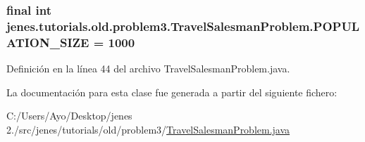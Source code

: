 \hypertarget{classjenes_1_1tutorials_1_1old_1_1problem3_1_1_travel_salesman_problem_a388d4fcbb82c911c4646c5de782f4d59}{
\subsubsection[{P\-O\-P\-U\-L\-A\-T\-I\-O\-N\-\_\-\-S\-I\-Z\-E}]{\setlength{\rightskip}{0pt plus 5cm}final int jenes.\-tutorials.\-old.\-problem3.\-Travel\-Salesman\-Problem.\-P\-O\-P\-U\-L\-A\-T\-I\-O\-N\-\_\-\-S\-I\-Z\-E = 1000\hspace{0.3cm}{\ttfamily [static]}}}\label{classjenes_1_1tutorials_1_1old_1_1problem3_1_1_travel_salesman_problem_a388d4fcbb82c911c4646c5de782f4d59}


Definición en la línea 44 del archivo Travel\-Salesman\-Problem.\-java.



La documentación para esta clase fue generada a partir del siguiente fichero\-:\begin{DoxyCompactItemize}
\item 
C\-:/\-Users/\-Ayo/\-Desktop/jenes 2./src/jenes/tutorials/old/problem3/\hyperlink{tutorials_2old_2problem3_2_travel_salesman_problem_8java}{Travel\-Salesman\-Problem.\-java}\end{DoxyCompactItemize}
